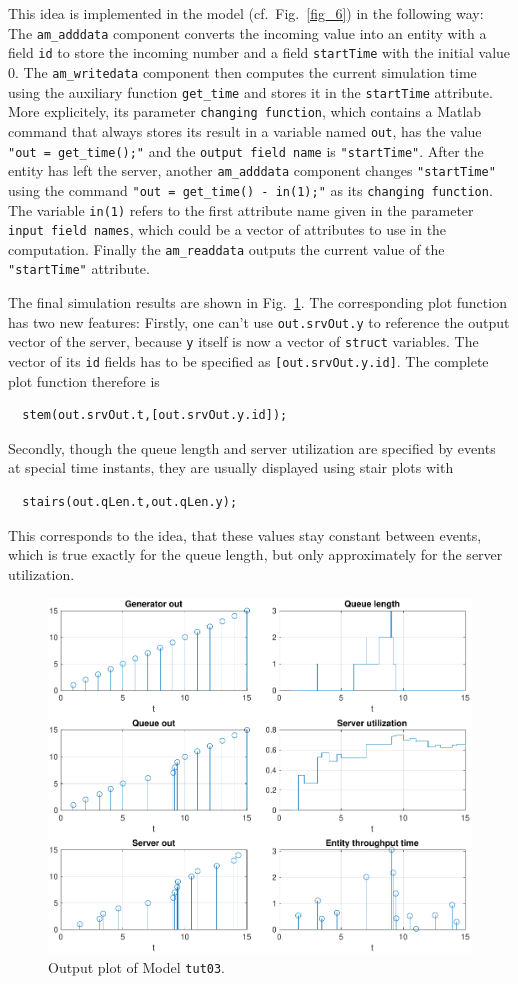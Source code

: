 \documentclass[12pt,oneside,a4paper,bibtotoc,BCOR=0pt,DIV=20]{scrreprt}
\newcommand{\cft}[1]{\mbox{\texttt{#1}}}   %
\begin{document}
This idea is implemented in the model (cf.\ Fig.\ \ref{fig_6}) in the following
way: The \cft{am\_adddata} component converts the incoming value into an entity
with a field \cft{id} to store the incoming number and a field \cft{startTime}
with the initial value $0$. The \cft{am\_writedata} component then computes the
current simulation time using the auxiliary function \cft{get\_time} and stores
it in the \cft{startTime} attribute. More explicitely, its parameter
\cft{changing function}, which contains a Matlab command that always stores its
result in a variable named \cft{out}, has the value \cft{"out = get\_time();"}
and the \cft{output field name} is \cft{"startTime"}. After the entity has left
the server, another \cft{am\_adddata} component changes \cft{"startTime"} using
the command \cft{"out = get\_time() - in(1);"} as its \cft{changing
  function}. The variable \cft{in(1)} refers to the first attribute name given
in the parameter \cft{input field names}, which could be a vector of attributes
to use in the computation. Finally the \cft{am\_readdata} outputs the current
value of the \cft{"startTime"} attribute.

The final simulation results are shown in Fig.\ \ref{fig_7}. The corresponding
plot function has two new features: Firstly, one can't use \cft{out.srvOut.y}
to reference the output vector of the server, because \cft{y} itself is now a
vector of \cft{struct} variables. The vector of its \cft{id} fields has to be
specified as \cft{[out.srvOut.y.id]}. The complete plot function therefore is
\begin{verbatim}
  stem(out.srvOut.t,[out.srvOut.y.id]);
\end{verbatim}
Secondly, though the queue length and server utilization are specified by
events at special time instants, they are usually displayed using stair plots
with
\begin{verbatim}
  stairs(out.qLen.t,out.qLen.y);
\end{verbatim}
This corresponds to the idea, that these values stay constant between events,
which is true exactly for the queue length, but only approximately for the
server utilization.

\begin{figure}[ht]
\centering
\includegraphics[width=0.50\columnwidth]{images/bild07.pdf}
\caption{Output plot of Model \cft{tut03}.}
\label{fig_7}
\end{figure}
\end{document}
